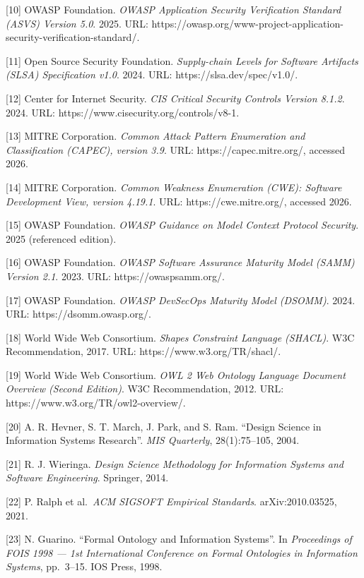 \documentclass[
]{article}
\begin{document}
{[}10{]} OWASP Foundation. \emph{OWASP Application Security Verification
Standard (ASVS) Version 5.0}. 2025. URL:
https://owasp.org/www-project-application-security-verification-standard/.

{[}11{]} Open Source Security Foundation. \emph{Supply-chain Levels for
Software Artifacts (SLSA) Specification v1.0}. 2024. URL:
https://slsa.dev/spec/v1.0/.

{[}12{]} Center for Internet Security. \emph{CIS Critical Security
Controls Version 8.1.2}. 2024. URL:
https://www.cisecurity.org/controls/v8-1.

{[}13{]} MITRE Corporation. \emph{Common Attack Pattern Enumeration and
Classification (CAPEC), version 3.9}. URL: https://capec.mitre.org/,
accessed 2026.

{[}14{]} MITRE Corporation. \emph{Common Weakness Enumeration (CWE):
Software Development View, version 4.19.1}. URL: https://cwe.mitre.org/,
accessed 2026.

{[}15{]} OWASP Foundation. \emph{OWASP Guidance on Model Context
Protocol Security}. 2025 (referenced edition).

{[}16{]} OWASP Foundation. \emph{OWASP Software Assurance Maturity Model
(SAMM) Version 2.1}. 2023. URL: https://owaspsamm.org/.

{[}17{]} OWASP Foundation. \emph{OWASP DevSecOps Maturity Model
(DSOMM)}. 2024. URL: https://dsomm.owasp.org/.

{[}18{]} World Wide Web Consortium. \emph{Shapes Constraint Language
(SHACL)}. W3C Recommendation, 2017. URL: https://www.w3.org/TR/shacl/.

{[}19{]} World Wide Web Consortium. \emph{OWL 2 Web Ontology Language
Document Overview (Second Edition)}. W3C Recommendation, 2012. URL:
https://www.w3.org/TR/owl2-overview/.

{[}20{]} A. R. Hevner, S. T. March, J. Park, and S. Ram. ``Design
Science in Information Systems Research''. \emph{MIS Quarterly},
28(1):75--105, 2004.

{[}21{]} R. J. Wieringa. \emph{Design Science Methodology for
Information Systems and Software Engineering}. Springer, 2014.

{[}22{]} P. Ralph et al.~\emph{ACM SIGSOFT Empirical Standards}.
arXiv:2010.03525, 2021.

{[}23{]} N. Guarino. ``Formal Ontology and Information Systems''. In
\emph{Proceedings of FOIS 1998 --- 1st International Conference on
Formal Ontologies in Information Systems}, pp.~3--15. IOS Press, 1998.
\end{document}
